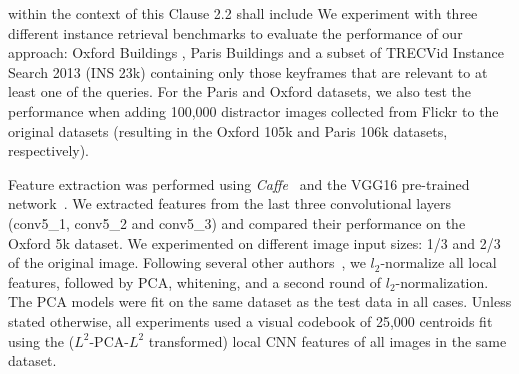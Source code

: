 \documentclass{sig-arxiv}
\begin{document}
within the context of this Clause 2.2 shall include %
We experiment with three different instance retrieval benchmarks to evaluate the performance of our approach: Oxford Buildings \cite{philbin2007object}, Paris Buildings \cite{paris6k} and a subset of TRECVid Instance Search 2013 (INS 23k) \cite{trecvid} containing only those keyframes that are relevant to at least one of the queries. For the Paris and Oxford datasets, we also test the performance when adding 100,000 distractor images collected from Flickr to the original datasets (resulting in the Oxford 105k and Paris 106k datasets, respectively). 

Feature extraction was performed using \emph{Caffe}~\cite{caffe} and the VGG16 pre-trained network~\cite{vgg}. We extracted features from the last three convolutional layers (conv5\_1, conv5\_2 and conv5\_3) and compared their performance on the Oxford 5k dataset. We experimented on different image input sizes: 1/3 and 2/3 of the original image. Following several other authors~\cite{babenko2015,kalantidis2015}, we $l_2$-normalize all local features, followed by PCA, whitening, and a second round of $l_2$-normalization. The PCA models were fit on the same dataset as the test data in all cases. Unless stated otherwise, all experiments used a visual codebook of 25,000 centroids fit using the ($L^2$-PCA-$L^2$ transformed) local CNN features of all images in the same dataset.
\end{document}
